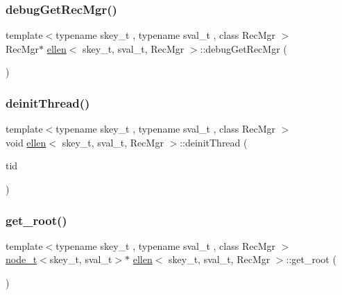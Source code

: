 \mbox{\label{classellen_a122174abdfec87e248ead195e6da56d1}} 
\subsubsection{\texorpdfstring{debug\+Get\+Rec\+Mgr()}{debugGetRecMgr()}}
{\footnotesize\ttfamily template$<$typename skey\+\_\+t , typename sval\+\_\+t , class Rec\+Mgr $>$ \\
Rec\+Mgr$\ast$ \hyperlink{classellen}{ellen}$<$ skey\+\_\+t, sval\+\_\+t, Rec\+Mgr $>$\+::debug\+Get\+Rec\+Mgr (\begin{DoxyParamCaption}{ }\end{DoxyParamCaption})\hspace{0.3cm}{\ttfamily [inline]}}

\mbox{\label{classellen_a9a24b5c1718973cb84ed1dfde8001133}} 
\subsubsection{\texorpdfstring{deinit\+Thread()}{deinitThread()}}
{\footnotesize\ttfamily template$<$typename skey\+\_\+t , typename sval\+\_\+t , class Rec\+Mgr $>$ \\
void \hyperlink{classellen}{ellen}$<$ skey\+\_\+t, sval\+\_\+t, Rec\+Mgr $>$\+::deinit\+Thread (\begin{DoxyParamCaption}\item[{const int}]{tid }\end{DoxyParamCaption})\hspace{0.3cm}{\ttfamily [inline]}}

\mbox{\label{classellen_addc23c69e65df78a07072c1a2cf73840}} 
\subsubsection{\texorpdfstring{get\+\_\+root()}{get\_root()}}
{\footnotesize\ttfamily template$<$typename skey\+\_\+t , typename sval\+\_\+t , class Rec\+Mgr $>$ \\
\hyperlink{structnode__t}{node\+\_\+t}$<$skey\+\_\+t, sval\+\_\+t$>$$\ast$ \hyperlink{classellen}{ellen}$<$ skey\+\_\+t, sval\+\_\+t, Rec\+Mgr $>$\+::get\+\_\+root (\begin{DoxyParamCaption}{ }\end{DoxyParamCaption})\hspace{0.3cm}{\ttfamily [inline]}}

